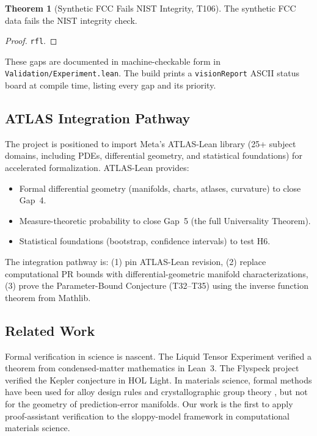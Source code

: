 \documentclass[11pt,a4paper]{article}
\theoremstyle{definition}
\newtheorem{theorem}{Theorem}[section]
\theoremstyle{plain}
\begin{document}
\begin{theorem}[Synthetic FCC Fails NIST Integrity, T106]
\label{thm:failsnist}
The synthetic FCC data fails the NIST integrity check.
\end{theorem}
\begin{proof}
\texttt{rfl}.
\end{proof}

These gaps are documented in machine-checkable form in \texttt{Validation/Experiment.lean}. The build prints a \texttt{visionReport} ASCII status board at compile time, listing every gap and its priority.

\subsection{ATLAS Integration Pathway}
\label{subsec:atlas}

The project is positioned to import Meta's ATLAS-Lean library (25+ subject domains, including PDEs, differential geometry, and statistical foundations) for accelerated formalization. ATLAS-Lean provides:
\begin{itemize}
\item Formal differential geometry (manifolds, charts, atlases, curvature) to close Gap~4.
\item Measure-theoretic probability to close Gap~5 (the full Universality Theorem).
\item Statistical foundations (bootstrap, confidence intervals) to test H6.
\end{itemize}
The integration pathway is: (1) pin ATLAS-Lean revision, (2) replace computational PR bounds with differential-geometric manifold characterizations, (3) prove the Parameter-Bound Conjecture (T32--T35) using the inverse function theorem from Mathlib.

\subsection{Related Work}
\label{subsec:related}

Formal verification in science is nascent. The Liquid Tensor Experiment \cite{scholze2021liquid} verified a theorem from condensed-matter mathematics in Lean~3. The Flyspeck project \cite{hales2014flyspeck} verified the Kepler conjecture in HOL Light. In materials science, formal methods have been used for alloy design rules \cite{ward2018martensite} and crystallographic group theory \cite{international2016crystallographic}, but not for the geometry of prediction-error manifolds. Our work is the first to apply proof-assistant verification to the sloppy-model framework in computational materials science.
\end{document}
